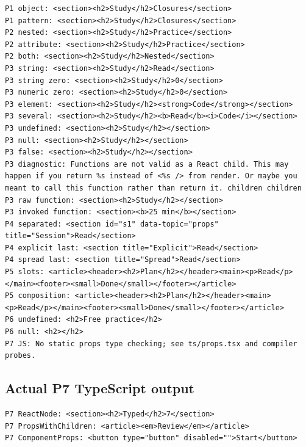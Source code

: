 \documentclass[
  10pt,
  a4paper,
]{article}
\begin{document}
\begin{minipage}{\linewidth}

\begin{lstlisting}
P1 object: <section><h2>Study</h2>Closures</section>
P1 pattern: <section><h2>Study</h2>Closures</section>
P2 nested: <section><h2>Study</h2>Practice</section>
P2 attribute: <section><h2>Study</h2>Practice</section>
P2 both: <section><h2>Study</h2>Nested</section>
P3 string: <section><h2>Study</h2>Read</section>
P3 string zero: <section><h2>Study</h2>0</section>
P3 numeric zero: <section><h2>Study</h2>0</section>
P3 element: <section><h2>Study</h2><strong>Code</strong></section>
P3 several: <section><h2>Study</h2><b>Read</b><i>Code</i></section>
P3 undefined: <section><h2>Study</h2></section>
P3 null: <section><h2>Study</h2></section>
P3 false: <section><h2>Study</h2></section>
P3 diagnostic: Functions are not valid as a React child. This may happen if you return %s instead of <%s /> from render. Or maybe you meant to call this function rather than return it. children children
P3 raw function: <section><h2>Study</h2></section>
P3 invoked function: <section><b>25 min</b></section>
P4 separated: <section id="s1" data-topic="props" title="Session">Read</section>
P4 explicit last: <section title="Explicit">Read</section>
P4 spread last: <section title="Spread">Read</section>
P5 slots: <article><header><h2>Plan</h2></header><main><p>Read</p></main><footer><small>Done</small></footer></article>
P5 composition: <article><header><h2>Plan</h2></header><main><p>Read</p></main><footer><small>Done</small></footer></article>
P6 undefined: <h2>Free practice</h2>
P6 null: <h2></h2>
P7 JS: No static props type checking; see ts/props.tsx and compiler probes.
\end{lstlisting}

\end{minipage}\par

\subsection{Actual P7 TypeScript
output}\label{actual-p7-typescript-output}

\begin{minipage}{\linewidth}

\begin{lstlisting}
P7 ReactNode: <section><h2>Typed</h2>7</section>
P7 PropsWithChildren: <article><em>Review</em></article>
P7 ComponentProps: <button type="button" disabled="">Start</button>
\end{lstlisting}

\end{minipage}\par
\end{document}
